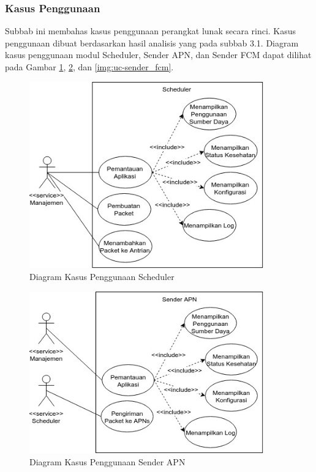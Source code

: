 \subsubsection{Kasus Penggunaan}
\par Subbab ini membahas kasus penggunaan perangkat lunak secara rinci. Kasus penggunaan dibuat berdasarkan hasil analisis yang pada subbab 3.1. Diagram kasus penggunaan modul Scheduler, Sender APN, dan Sender FCM dapat dilihat pada Gambar \ref{img:uc-scheduler}, \ref{img:uc-sender_apn}, dan \ref{img:uc-sender_fcm}.
\clearpage
\begin{figure}[H]
    \centering\includegraphics[width=0.9\textwidth]{bab3/img/usecase-scheduler.jpg}
    \caption{Diagram Kasus Penggunaan Scheduler} \label{img:uc-scheduler}
\end{figure}
\begin{figure}[H]
	\centering\includegraphics[width=0.9\textwidth]{bab3/img/usecase-sender_apn.jpg}
	\caption{Diagram Kasus Penggunaan Sender APN} \label{img:uc-sender_apn}
\end{figure}
